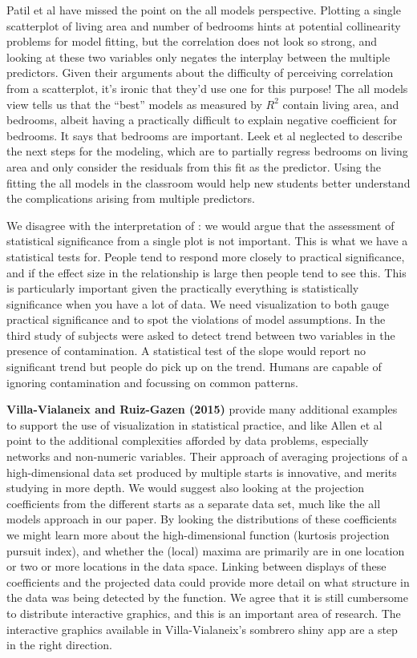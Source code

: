\documentclass[preprint]{imsart}
\begin{document}
Patil et al have missed the point on the all models perspective. Plotting a single scatterplot of living area and number of bedrooms hints at potential collinearity problems for model fitting, but the correlation does not look so strong, and looking at these two variables only negates the interplay between the multiple predictors. Given their arguments about the difficulty of perceiving correlation from a scatterplot, it's ironic that they'd use one for this purpose! The all models view tells us that the ``best'' models as measured by $R^2$ contain living area, and bedrooms, albeit having a practically difficult to explain negative coefficient for bedrooms. It says that bedrooms are important. Leek et al neglected to describe the next steps for the modeling, which are to partially regress bedrooms on living area and only consider the residuals from this fit as the predictor. Using the fitting the all models in the classroom would help new students better understand the complications arising from multiple predictors.

We disagree with the interpretation of \cite{Fisher}: we would argue that the assessment of statistical significance from a single plot is not important. This is what we have a statistical tests for. People tend to respond more closely to practical significance, and if the effect size in the relationship is large then people tend to see this. This is particularly important given the practically everything is statistically significance when you have a lot of data. We need visualization to both gauge practical significance and to spot the violations of model assumptions. In the third study of \cite{majumder:2013} subjects were asked to detect trend between two variables in the presence of contamination. A statistical test of the slope would report no significant trend but people do pick up on the trend. Humans are capable of ignoring contamination and focussing on common patterns.


\textbf{Villa-Vialaneix and Ruiz-Gazen (2015)} provide many additional examples to support the use of visualization in statistical practice, and like Allen et al point to the additional complexities afforded by data problems, especially networks and non-numeric variables. Their approach of averaging projections of a high-dimensional data set produced by multiple starts is innovative, and merits studying in more depth. We would suggest also looking at the projection coefficients from the different starts as a separate data set, much like the all models approach in our paper. By looking the distributions of these coefficients we might learn more about the high-dimensional function (kurtosis projection pursuit index), and whether the (local) maxima are primarily are in one location or two or more locations in the data space. Linking between displays of these coefficients and the projected data could provide more detail on what structure in the data was being detected by the function. We agree that it is still cumbersome to distribute interactive graphics, and this is an important area of research. The interactive graphics available in Villa-Vialaneix's sombrero shiny app are a step in the right direction.
\end{document}
